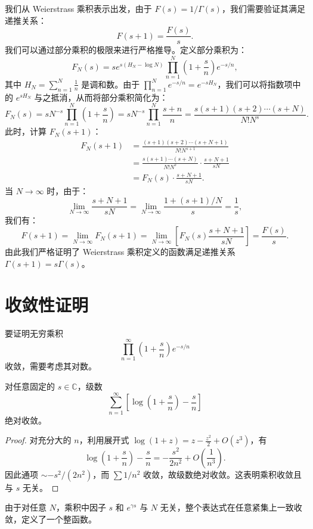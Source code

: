 我们从 Weierstrass 乘积表示出发，由于 \(F(s) = 1/\Gamma(s)\)，我们需要验证其满足递推关系：
\[
F(s+1) = \frac{F(s)}{s}.
\]
我们可以通过部分乘积的极限来进行严格推导。定义部分乘积为：
\[
F_N(s) = s e^{s(H_N - \log N)} \prod_{n=1}^N \left(1 + \frac{s}{n}\right) e^{-s/n},
\]
其中 \(H_N = \sum_{n=1}^N \frac{1}{n}\) 是调和数。由于 \(\prod_{n=1}^N e^{-s/n} = e^{-s H_N}\)，我们可以将指数项中的 \(e^{s H_N}\) 与之抵消，从而将部分乘积简化为：
\[
F_N(s) = s N^{-s} \prod_{n=1}^N \left(1 + \frac{s}{n}\right) = s N^{-s} \prod_{n=1}^N \frac{s+n}{n} = \frac{s(s+1)(s+2)\cdots(s+N)}{N! N^s}.
\]
此时，计算 \(F_N(s+1)\)：
\begin{align*}
F_N(s+1) &= \frac{(s+1)(s+2)\cdots(s+N+1)}{N! N^{s+1}} \\
&= \frac{s(s+1)\cdots(s+N)}{N! N^s} \cdot \frac{s+N+1}{s N} \\
&= F_N(s) \cdot \frac{s+N+1}{s N}.
\end{align*}
当 \(N \to \infty\) 时，由于：
\[
\lim_{N \to \infty} \frac{s+N+1}{s N} = \lim_{N \to \infty} \frac{1 + (s+1)/N}{s} = \frac{1}{s},
\]
我们有：
\[
F(s+1) = \lim_{N \to \infty} F_N(s+1) = \lim_{N \to \infty} \left[ F_N(s) \frac{s+N+1}{s N} \right] = \frac{F(s)}{s}.
\]
由此我们严格证明了 Weierstrass 乘积定义的函数满足递推关系 \(\Gamma(s+1) = s \Gamma(s)\)。

\section{收敛性证明}

要证明无穷乘积
\[
\prod_{n=1}^\infty \left(1 + \frac{s}{n}\right) e^{-s/n}
\]
收敛，需要考虑其对数。

\begin{proposition}{}{}
对任意固定的 \(s \in \mathbb{C}\)，级数
\[
\sum_{n=1}^\infty \left[ \log\left(1 + \frac{s}{n}\right) - \frac{s}{n} \right]
\]
绝对收敛。
\end{proposition}

\begin{proof}
对充分大的 \(n\)，利用展开式 \(\log(1+z) = z - \frac{z^2}{2} + O(z^3)\)，有
\[
\log\left(1 + \frac{s}{n}\right) - \frac{s}{n} = -\frac{s^2}{2n^2} + O\left(\frac{1}{n^3}\right).
\]
因此通项 \(\sim -s^2/(2n^2)\)，而 \(\sum 1/n^2\) 收敛，故级数绝对收敛。这表明乘积收敛且与 \(s\) 无关。
\end{proof}

由于对任意 \(N\)，乘积中因子 \(s\) 和 \(e^{\gamma s}\) 与 \(N\) 无关，整个表达式在任意紧集上一致收敛，定义了一个整函数。


